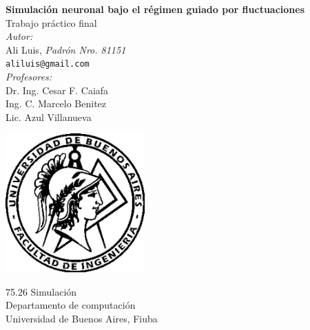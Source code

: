 \begin{titlepage}
    \begin{center}
        \vspace*{1cm}
            
        \Huge
        \textbf{Simulación neuronal bajo el régimen guiado por fluctuaciones}\\
        \vspace{0.5cm}
        \LARGE
        Trabajo práctico final\\
        \vspace{1.5cm}
        \small{\emph{Autor:}\\
      	Ali Luis, \textit{Padrón Nro. 81151}\\ \texttt{aliluis@gmail.com}\\\bigskip
      	\emph{Profesores:}\\ \medskip
      	Dr. Ing. Cesar F. Caiafa\\
      	Ing. C. Marcelo Benitez\\ 
      	Lic. Azul Villanueva
      	}
            
        \vfill
            
            
        \includegraphics[width=0.4\textwidth]{figures/logo_fiuba.png}
            
        \Large
        75.26 Simulación\\
        Departamento de computación\\
        Universidad de Buenos Aires, Fiuba
            
    \end{center}
\end{titlepage}